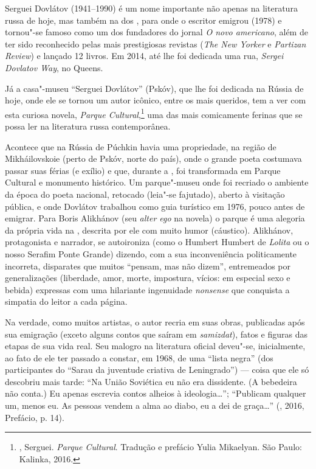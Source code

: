 Serguei Dovlátov (1941--1990) é um nome importante não apenas na
literatura russa de hoje, mas também na dos , para onde o escritor
emigrou (1978) e tornou"-se famoso como um dos fundadores do jornal \emph{O novo
americano}, além de ter sido reconhecido pelas mais prestigiosas revistas (\emph{The New
Yorker} e \emph{Partizan Review}) e lançado 12 livros. Em 2014, até lhe foi dedicada
uma rua, \emph{Sergei Dovlatov Way}, no Queens.

Já a casa"-museu ``Serguei Dovlátov'' (Pskóv), que lhe foi dedicada na Rússia de
hoje, onde ele se tornou um autor icônico, entre os mais queridos, tem a
ver com esta curiosa novela, \emph{Parque 
Cultural},\footnote{, Serguei. \emph{Parque Cultural}.
 Tradução e prefácio Yulia Mikaelyan. São Paulo: Kalinka, 2016.} uma das mais comicamente ferinas que se
possa ler na literatura russa contemporânea. 

Acontece que na Rússia de Púchkin havia uma propriedade, na região de Mikháilovskoie (perto de
Pskóv, norte do país), onde o grande poeta costumava passar suas
férias (e exílio) e que, durante a , foi transformada em
Parque Cultural e monumento histórico. Um parque"-museu onde foi
recriado o ambiente da época do poeta nacional, retocado (leia"-se
fajutado), aberto à visitação pública, e onde Dovlátov trabalhou
como guia turístico em 1976, pouco antes de emigrar.
Para Boris Alikhánov (seu \emph{alter ego} na novela) o parque é uma alegoria da própria
vida na , descrita por ele com muito humor (cáustico). 
Alikhánov, protagonista e narrador, se autoironiza (como o Humbert Humbert de
\emph{Lolita} ou o nosso Serafim Ponte Grande) dizendo, com a sua
inconveniência politicamente incorreta, disparates que muitos ``pensam,
mas não dizem'', entremeados por generalizações
(liberdade, amor, morte, impostura, vícios: em especial sexo e
bebida) expressas com uma hilariante ingenuidade \emph{nonsense} que
conquista a simpatia do leitor a cada página.

Na verdade, como muitos artistas, o autor recria em suas obras, publicadas
após sua emigração (exceto alguns contos que saíram em \emph{samizdat}), fatos e figuras das etapas de sua vida
real. Seu malogro na literatura oficial deveu"-se, inicialmente, ao fato de ele
ter passado a constar, em 1968, de uma ``lista negra'' (dos
participantes do ``Sarau da juventude criativa de Leningrado'') --- coisa
que ele só descobriu mais tarde: ``Na União Soviética eu não era
dissidente. (A bebedeira não conta.) Eu apenas escrevia contos alheios à
ideologia\ldots{}''; ``Publicam qualquer um, menos eu. As pessoas vendem a alma ao
diabo, eu a dei de graça\ldots{}'' (, 2016, Prefácio, p. 14).

